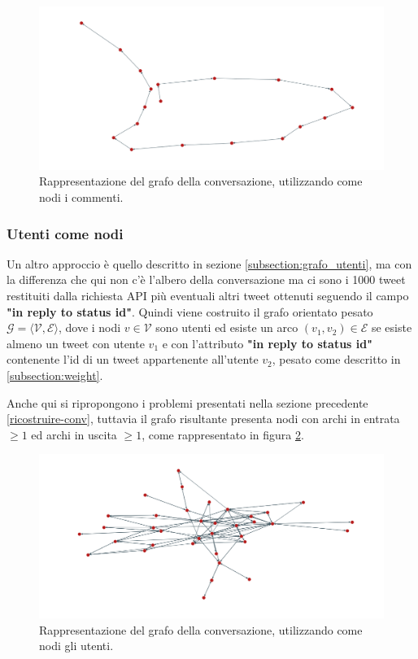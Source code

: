 \begin{figure}[ht]
    \includegraphics[width=\linewidth]{Immagini/twitter.png}
    \caption{Rappresentazione del grafo della conversazione, utilizzando come nodi i commenti.}
    \label{fig:comment-twitter}
\end{figure}

\subsubsection {Utenti come nodi}
Un altro approccio è quello descritto in sezione \ref{subsection:grafo_utenti}, ma con la differenza che qui non c'è l'albero della conversazione ma ci sono i 1000 tweet restituiti dalla richiesta API più eventuali altri tweet ottenuti seguendo il campo \textbf{"in reply to status id"}. Quindi viene costruito il grafo orientato pesato $\mathcal{G = ⟨V, E⟩}$, dove i nodi $v \in \mathcal{V}$ sono utenti ed esiste un arco $(v_1,v_2) \in \mathcal{E}$ se esiste almeno un tweet con utente $v_1$ e con l'attributo \textbf{"in reply to status id"} contenente l'id di un tweet appartenente all'utente $v_2$, pesato come descritto in \ref{subsection:weight}.

Anche qui si ripropongono i problemi presentati nella sezione precedente \ref{ricostruire-conv}, tuttavia il grafo risultante presenta nodi con archi in entrata $\geq 1$ ed archi in uscita $\geq 1$, come rappresentato in figura \ref{fig:users-twitter}.

\begin{figure}[H]
    \includegraphics[width=\linewidth]{Immagini/twitter-users.png}
    \caption{Rappresentazione del grafo della conversazione, utilizzando come nodi gli utenti.}
    \label{fig:users-twitter}
\end{figure}



